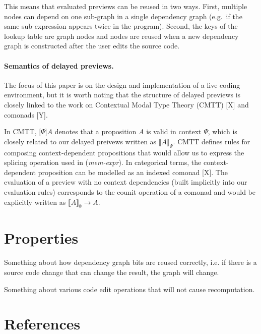 \documentclass[sigplan,10pt]{acmart}\settopmatter{printfolios=true,printccs=false,printacmref=false}
\begin{document}
This means that evaluated previews can be reused in two ways. First, multiple nodes can 
depend on one sub-graph in a single dependency graph (e.g.~if the same sub-expression appears
twice in the program). Second, the keys of the lookup table are graph nodes and nodes are 
reused when a new dependency graph is constructed after the user edits the source code.

\paragraph{Semantics of delayed previews.}
The focus of this paper is on the design and implementation of a live coding environment, 
but it is worth noting that the structure of delayed previews is closely linked to the work
on Contextual Modal Type Theory (CMTT) [X] and comonads [Y]. 

In CMTT, $\lbrack \Psi \rbrack A$ denotes that a proposition $A$ is valid in context $\Psi$,
which is closely related to our delayed preivews written as $\llbracket A \rrbracket_\Psi$.
CMTT defines rules for composing context-dependent propositions that would allow us to express
the splicing operation used in (\emph{mem-expr}). In categorical terms, the context-dependent
proposition can be modelled as an indexed comonad [X]. The evaluation of a preview with no 
context dependencies (built implicitly into our evaluation rules) corresponds to the counit
operation of a comonad and would be explicitly written as $\llbracket A \rrbracket_\emptyset \rightarrow A$.


\section{Properties}
\newpage

Something about how dependency graph bits are reused correctly, i.e. if there is a source code
change that can change the result, the graph will change.

Something about various code edit operations that will not cause recomputation.


\newpage

\newpage

\section*{References}


\end{document}

